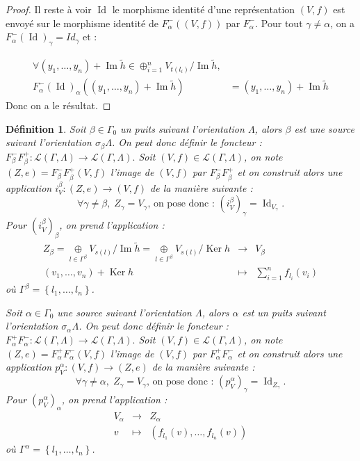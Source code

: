 \documentclass[a4paper,10pt]{article}
\newtheorem{defi}[thm]{Définition}%
\DeclareMathOperator{\Ker}{Ker}
\DeclareMathOperator{\Id}{Id}
\DeclareMathOperator{\Img}{Im}
\begin{document}
\begin{proof}
 Il reste à voir $\Id$ le morphisme identité d'une représentation $(V,f)$ est envoyé sur le morphisme identité de $F^{-}_{\alpha}((V,f))$ par $F^{-}_{\alpha}$. Pour tout $\gamma \neq \alpha$, on a $F^{-}_{\alpha}(\Id)_{\gamma} = Id_{\gamma}$ et : 

\[
\begin{array}{rl}
  \forall (y_{1}, \dots, y_{n}) + \Img \widetilde{h} \in \oplus_{i=1}^{n} V_{t(l_{i})} / \Img \widetilde{h},& \\
F^{-}_{\alpha}(\Id)_{\alpha}((y_{1}, \dots, y_{n}) + \Img \widetilde{h}) &= (y_{1}, \dots, y_{n}) + \Img \widetilde{h}
\end{array}
\]
Donc on a le résultat.
\end{proof}

\begin{defi}
	Soit $\beta\in\Gamma_{0}$ un puits suivant l'orientation $\Lambda$, alors $\beta$ est une source suivant l'orientation $\sigma_{\beta}\Lambda$. On peut donc définir le foncteur : $F_{\beta}^{-}F_{\beta}^{+}:\mathscr{L}(\Gamma,\Lambda)\rightarrow\mathscr{L}(\Gamma,\Lambda).$ Soit $(V,f)\in\mathscr{L}(\Gamma,\Lambda)$, on note $(Z,e)=F_{\beta}^{-}F_{\beta}^{+}(V,f)$ l'image de $(V,f)$ par $F_{\beta}^{-}F_{\beta}^{+}$ et on construit alors une application $i_{V}^{\beta}:(Z,e)\rightarrow (V,f)$ de la manière suivante :
	\[
		\forall \gamma\neq\beta,\;Z_{\gamma}=V_{\gamma}\text{, on pose donc : }(i_{V}^{\beta})_{\gamma}=\Id_{V_{\gamma}}.
	\]
	Pour $(i_{V}^{\beta})_{\beta}$, on prend l'application : 
	\[
	\begin{array}{ccc}
		Z_{\beta}=\underset{l\in\Gamma^{\beta}}{\oplus} V_{s(l)}/\Img \widetilde{h}=\underset{l\in\Gamma^{\beta}}{\oplus} V_{s(l)}/\Ker h & \rightarrow & V_{\beta} \\
		(v_{1},\dots,v_{n})+\Ker h & \mapsto & \sum_{i=1}^{n}f_{l_{i}}(v_{i})
	\end{array}
	\]
	où $\Gamma^{\beta}=\left\{ l_{1},\dots,l_{n} \right\}$.

        Soit $\alpha\in\Gamma_{0}$ une source suivant l'orientation $\Lambda$, alors $\alpha$ est un puits suivant l'orientation $\sigma_{\alpha}\Lambda$. On peut donc définir le foncteur : $F_{\alpha}^{+}F_{\alpha}^{-}:\mathscr{L}(\Gamma,\Lambda)\rightarrow\mathscr{L}(\Gamma,\Lambda).$ Soit $(V,f)\in\mathscr{L}(\Gamma,\Lambda)$, on note $(Z,e)=F_{\alpha}^{+}F_{\alpha}^{-}(V,f)$ l'image de $(V,f)$ par $F_{\alpha}^{+}F_{\alpha}^{-}$ et on construit alors une application $p_{V}^{\alpha}:  (V,f)\rightarrow (Z,e)$ de la manière suivante :
	\[
		\forall \gamma\neq\alpha,\;Z_{\gamma}=V_{\gamma}\text{, on pose donc : }(p_{V}^{\alpha})_{\gamma}=\Id_{Z_{\gamma}}.
	\]
	Pour $(p_{V}^{\alpha})_{\alpha}$, on prend l'application : 
	\[
	\begin{array}{ccc}
		 V_{\alpha} & \rightarrow & Z_{\alpha} \\
		v & \mapsto & (f_{l_{1}}(v), \dots, f_{l_{n}}(v))
	\end{array}
	\]
	où $\Gamma^{\alpha}=\left\{ l_{1},\dots,l_{n} \right\}$.
\end{defi}
\end{document}
